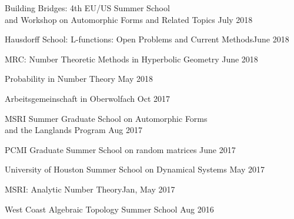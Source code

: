 \documentclass[margin,line,pifont,palatino,courier]{res}
\newenvironment{list1}{
  \begin{list}{\ding{113}}{%
      \setlength{\itemsep}{0in}
      \setlength{\parsep}{0in} \setlength{\parskip}{0in}
      \setlength{\topsep}{0in} \setlength{\partopsep}{0in}
      \setlength{\leftmargin}{0.17in}}}{\end{list}}
\begin{document}
\begin{resume}
\begin{list1}
\item {Building Bridges: 4th EU/US Summer School \\and Workshop on Automorphic Forms and Related Topics
} {\hfill  July 2018}

\item {Hausdorff School: L-functions: Open Problems and Current Methods}{\hfill  June 2018}

\item {MRC: Number Theoretic Methods
	in Hyperbolic Geometry
	} {\hfill  June 2018}

\item {Probability in Number Theory}{ \hfill  May 2018}

\item {Arbeitsgemeinschaft in Oberwolfach} {\hfill  Oct 2017}

\item {MSRI Summer Graduate School on Automorphic Forms \\and the Langlands Program} {\hfill  Aug 2017}
 
 \item {PCMI Graduate Summer School on random matrices} {\hfill  June 2017}
 
\item { University of Houston Summer School on Dynamical Systems} {\hfill  May 2017}

\item {MSRI: Analytic Number Theory}{\hfill  Jan, May 2017}

\item { West Coast Algebraic Topology Summer School} {\hfill  Aug 2016}


\end{list1}
\end{resume}
\end{document}
